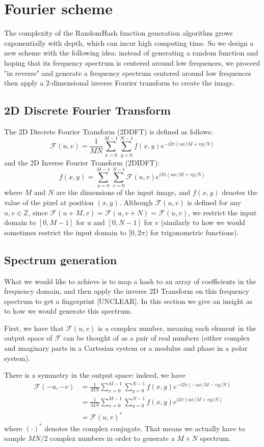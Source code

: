 \documentclass{article}
\begin{document}
\section{Fourier scheme}
The complexity of the RandomHash function generation algorithm grows exponentially with depth, which can incur high computing time. So we design a new scheme with the following idea: instead of generating a random function and hoping that its frequency spectrum is centered around low frequences, we proceed "in reverse" and generate a frequency spectrum centered around low frequences then apply a 2-dimensional inverse Fourier transform to create the image.

\subsection{2D Discrete Fourier Transform}
The 2D Discrete Fourier Transform (2DDFT) is defined as follows:
$$\mathcal{F}(u,v) = \frac{1}{MN}\sum\limits_{x=0}^{M-1}\sum\limits_{y=0}^{N-1}f(x,y) e^{-i2\pi(ux/M + vy/N)}$$
and the 2D Inverse Fourier Transform (2DIDFT):
$$f(x,y) = \sum\limits_{u=0}^{M-1}\sum\limits_{v=0}^{N-1}\mathcal F(u,v) e^{i2\pi(ux/M + vy/N)}$$
where $M$ and $N$ are the dimensions of the input image, and $f(x,y)$ denotes the value of the pixel at position $(x,y)$. Although $\mathcal{F}(u,v)$ is defined for any $u,v \in \mathbb Z$, since $\mathcal F(u + M, v) = \mathcal F(u, v + N) = \mathcal F(u,v)$, we restrict the input domain to $[0,M-1]$ for $u$ and $[0,N-1]$ for $v$ (similarly to how we would sometimes restrict the input domain to $[0, 2\pi)$ for trigonometric functions).

\subsection{Spectrum generation}
What we would like to achieve is to map a hash to an array of coefficients in the frequency domain, and then apply the inverse 2D Transform on this frequency spectrum to get a fingerprint [UNCLEAR]. In this section we give an insight as to how we would generate this spectrum.

First, we have that $\mathcal{F}(u,v)$ is a complex number, meaning each element in the output space of $\mathcal F$ can be thought of as a pair of real numbers (either complex and imaginary parts in a Cartesian system or a modulus and phase in a polar system). 

There is a symmetry in the output space: indeed, we have 
\begin{align*}
    \mathcal{F}(-u,-v) &= \frac{1}{MN}\sum\limits_{x=0}^{M-1}\sum\limits_{y=0}^{N-1}f(x,y) e^{-i2\pi(-ux/M - vy/N)}\\
    &=  \frac{1}{MN}\sum\limits_{x=0}^{M-1}\sum\limits_{y=0}^{N-1}f(x,y) e^{i2\pi(ux/M + vy/N)}\\
    &= \mathcal{F}(u,v)^*
\end{align*}
where $(\cdot)^*$ denotes the complex conjugate. That means we actually have to sample $MN/2$ complex numbers in order to generate a $M \times N$ spectrum.
\end{document}
